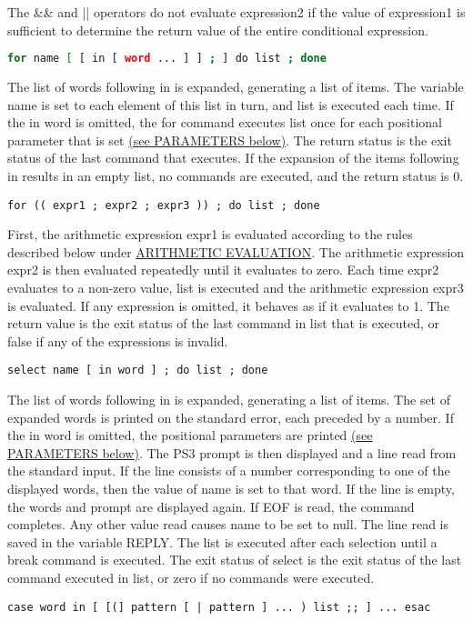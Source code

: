\documentclass[11pt]{article}
\begin{document}
The \&\& and || operators do not evaluate expression2 if the value of expression1 is sufficient to determine the return value of the entire conditional expression.
\begin{lstlisting}[language=bash]
for name [ [ in [ word ... ] ] ; ] do list ; done
\end{lstlisting}
The list of words following in is expanded, generating a list of items. The variable name is set to each element of this list in turn, and list is executed each time. If the in word is omitted, the for command executes list once for each positional parameter that is set \hyperref[sec:parameters]{(see PARAMETERS below)}. The return status is the exit status of the last command that executes. If the expansion of the items following in results in an empty list, no commands are executed, and the return status is 0.
\begin{lstlisting}
for (( expr1 ; expr2 ; expr3 )) ; do list ; done
\end{lstlisting}
First, the arithmetic expression expr1 is evaluated according to the rules described below under \hyperref[sec:arithmeticevaluation]{ARITHMETIC EVALUATION}. The arithmetic expression expr2 is then evaluated repeatedly until it evaluates to zero. Each time expr2 evaluates to a non-zero value, list is executed and the arithmetic expression expr3 is evaluated. If any expression is omitted, it behaves as if it evaluates to 1. The return value is the exit status of the last command in list that is executed, or false if any of the expressions is invalid.
\begin{lstlisting}
select name [ in word ] ; do list ; done
\end{lstlisting}
The list of words following in is expanded, generating a list of items. The set of expanded words is printed on the standard error, each preceded by a number. If the in word is omitted, the positional parameters are printed \hyperref[sec:parameters]{(see PARAMETERS below)}. The PS3 prompt is then displayed and a line read from the standard input. If the line consists of a number corresponding to one of the displayed words, then the value of name is set to that word. If the line is empty, the words and prompt are displayed again. If EOF is read, the command completes. Any other value read causes name to be set to null. The line read is saved in the variable REPLY. The list is executed after each selection until a break command is executed. The exit status of select is the exit status of the last command executed in list, or zero if no commands were executed.
\begin{lstlisting}
case word in [ [(] pattern [ | pattern ] ... ) list ;; ] ... esac
\end{lstlisting}
\end{document}

